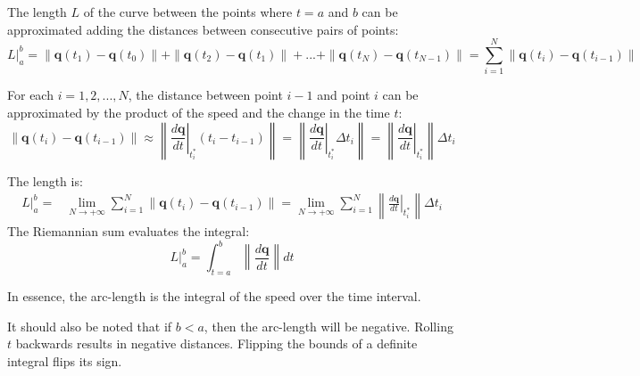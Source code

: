 \documentclass{article}
\begin{document}
The length \(L\) of the curve between the points where \(t = a\) and \(b\) can be approximated adding the distances between consecutive pairs of points:
\[L\Big|_a^b = \|\mathbf{q}(t_1) - \mathbf{q}(t_0)\| + \|\mathbf{q}(t_2) - \mathbf{q}(t_1)\| + ... + \|\mathbf{q}(t_N) - \mathbf{q}(t_{N-1})\| = \sum_{i=1}^N \|\mathbf{q}(t_i) - \mathbf{q}(t_{i-1})\|\]

For each \(i = 1, 2, ..., N\), the distance between point \(i-1\) and point \(i\) can be approximated by the product of the speed and the change in the time \(t\): 
\[\|\mathbf{q}(t_i) - \mathbf{q}(t_{i-1})\| 
\approx \left\|\left.\frac{d\mathbf{q}}{dt}\right|_{t_i^*}(t_i - t_{i-1})\right\| 
= \left\|\left.\frac{d\mathbf{q}}{dt}\right|_{t_i^*}\Delta t_i\right\|
= \left\|\left.\frac{d\mathbf{q}}{dt}\right|_{t_i^*}\right\|\Delta t_i\]

The length is: 
\begin{align*}
L\Big|_a^b = & \lim_{N \to +\infty} \sum_{i=1}^N \|\mathbf{q}(t_i) - \mathbf{q}(t_{i-1})\| 
= \lim_{N \to +\infty} \sum_{i=1}^N \left\|\left.\frac{d\mathbf{q}}{dt}\right|_{t_i^*}\right\|\Delta t_i 
\end{align*}
The Riemannian sum evaluates the integral:
\[L\Big|_a^b = \int_{t = a}^b \left\|\frac{d\mathbf{q}}{dt}\right\| dt\]

In essence, the arc-length is the integral of the speed over the time interval.

It should also be noted that if \(b < a\), then the arc-length will be negative. Rolling \(t\) backwards results in negative distances. Flipping the bounds of a definite integral flips its sign. 

\vspace{5mm}
\end{document}
